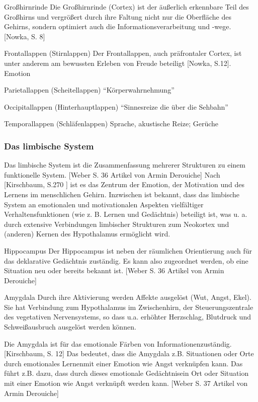 Großhirnrinde
Die Großhirnrinde (Cortex) ist der äußerlich erkennbare Teil des Großhirns und vergrößert durch ihre Faltung nicht nur die Oberfläche des Gehirns, sondern optimiert auch die Informationsverarbeitung und -wege. [Nowka, S. 8]

Frontallappen (Stirnlappen)
Der Frontallappen, auch präfrontaler Cortex, ist unter anderem am bewussten Erleben von Freude beteiligt [Nowka, S.12]. 
Emotion 

Parietallappen (Scheitellappen)
“Körperwahrnehmung”

Occipitallappen (Hinterhauptlappen)
“Sinnesreize die über die Sehbahn”

Temporallappen (Schläfenlappen)
Sprache, akustische Reize; Gerüche

\subsubsection{Das limbische System}
Das limbische System ist die Zusammenfassung mehrerer Strukturen zu einem funktionelle System. [Weber S. 36 Artikel von Armin Derouiche] Nach [Kirschbaum, S.270 ] ist es das  \glqq Zentrum der Emotion, der Motivation und des Lernens im menschlichen Gehirn\grqq. \glqq Inzwischen ist bekannt, dass das limbische System an emotionalen und motivationalen Aspekten vielfältiger Verhaltensfunktionen (wie z. B. Lernen und Gedächtnis) beteiligt ist, was u. a. durch extensive Verbindungen limbischer Strukturen zum Neokortex und (anderen) Kernen des Hypothalamus ermöglicht wird.\grqq [Kirschbaum, S.270 ]

Hippocampus
Der Hippocampus ist neben der räumlichen Orientierung auch für das deklarative Gedächtnis zuständig. Es kann also zugeordnet werden, ob eine Situation neu oder bereits bekannt ist. [Weber S. 36 Artikel von Armin Derouiche]

Amygdala
\glqq Durch ihre Aktivierung werden Affekte ausgelöst (Wut, Angst, Ekel). Sie hat Verbindung zum Hypothalamus im Zwischenhirn, der Steuerungszentrale des vegetativen Nervensystems, so
dass u.a. erhöhter Herzschlag, Blutdruck und Schweißausbruch ausgelöst werden
können.

Die Amygdala ist für das \glqq emotionale Färben von Informationen\grqq zuständig.  [Kirschbaum, S. 12] Das bedeutet, dass die Amygdala z.B. Situationen oder Orte durch \glqq emotionales Lernen\grqq mit einer Emotion wie Angst verknüpfen kann. Das führt z.B. dazu, dass durch dieses \glqq emotionale Gedächtnis\grqq ein Ort oder Situation mit einer Emotion wie Angst verknüpft werden kann. [Weber S. 37 Artikel von Armin Derouiche]   

